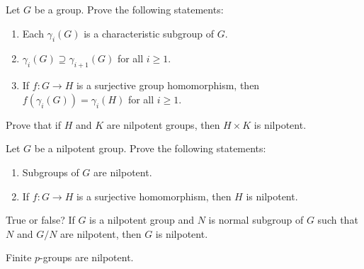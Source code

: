 \begin{exercise}
\label{xca:gamma}
Let $G$ be a group. Prove the following statements: 
\begin{enumerate}
\item Each $\gamma_i(G)$ is a characteristic subgroup of $G$. 
\item $\gamma_i(G)\supseteq\gamma_{i+1}(G)$ for all $i\geq1$.
\item If $f\colon G\to H$ is a surjective group homomorphism, then  
$f(\gamma_i(G))=\gamma_i(H)$ for all $i\geq1$.
\end{enumerate}
\end{exercise}

\begin{exercise}
\label{xca:HxK_nilpotente}
Prove that if $H$ and $K$ are nilpotent groups, then 
$H\times K$ is nilpotent. 
\end{exercise}

\begin{exercise}
\label{xca:nilpotente}
Let $G$ be a nilpotent group. Prove the following statements: 
\begin{enumerate}
\item Subgroups of $G$ are nilpotent. 
\item If $f\colon G\to H$ is a surjective homomorphism, then $H$ is nilpotent.  
\end{enumerate}
\end{exercise}


\begin{exercise}
   True or false? If $G$ is a nilpotent group and $N$ is normal 
   subgroup of $G$ such that $N$ and $G/N$ are nilpotent, then 
   $G$ is nilpotent. 
\end{exercise}


\begin{proposition}
\label{pro:nilpotent_pgroups}
Finite $p$-groups are nilpotent.
\end{proposition}


